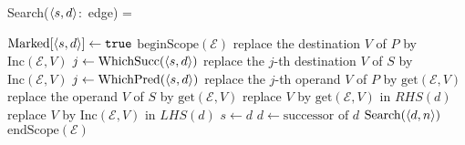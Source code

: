 Search($\left\langle s,d \right\rangle$:~edge) =
\begin{myalgorithmic}
\STATE $\text{Marked}[\left\langle s,d \right\rangle] \gets \texttt{true}$
\STATE $\text{beginScope}(\mathcal{E})$
  \STATE replace the destination $V$ of $P$ by $\text{Inc}(\mathcal{E}, V)$
         \label{line:rendef1}
 \ENDFOR
{}
  \STATE $j \gets \text{WhichSucc}(\left\langle s,d \right\rangle)$
  \STATE replace the $j$-th destination $V$ of $S$ by $\text{Inc}(\mathcal{E}, V)$
         \label{line:rendef2}
 \ENDFOR
\ENDIF
{} \label{line:searchloop_start}
   \STATE $j\gets \text{WhichPred}(\left\langle s,d \right\rangle)$
   \STATE replace the $j$-th operand $V$ of $P$ by $\text{get}(\mathcal{E}, V)$
  \ENDFOR
  \BREAK {}
   \STATE replace the operand $V$ of $S$ by $\text{get}(\mathcal{E}, V)$
  \ENDFOR
  \BREAK {}
 \ENDIF
 \STATE{}
  \STATE replace $V$ by $\text{get}(\mathcal{E}, V)$ in $RHS(d)$
 \ENDFOR
  \STATE replace $V$ by $\text{Inc}(\mathcal{E}, V)$ in $LHS(d)$
         \label{line:rendef3}
 \ENDFOR
  \BREAK {}
 \ENDIF
 \STATE $s \gets d$
 \STATE $d \gets \text{successor of }d$ \label{line:search_onesucc}
\ENDLOOP* \label{line:searchloop_end}
  \STATE $\text{Search}(\left\langle d, n \right\rangle)$ 
         \label{line:search2}
 \ENDIF
\ENDFOR
\STATE $\text{endScope}(\mathcal{E})$
\RETURN
\end{myalgorithmic}
